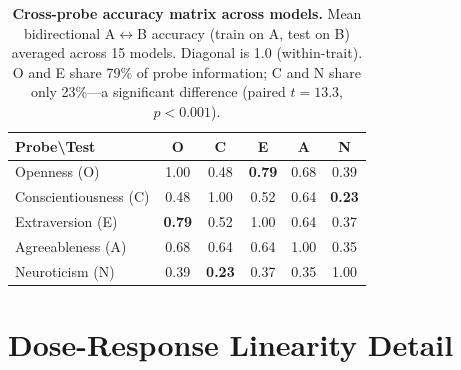 \documentclass{article}
\begin{document}
\begin{table}[h]
\caption{\textbf{Cross-probe accuracy matrix across models.} Mean bidirectional A$\leftrightarrow$B accuracy (train on A, test on B) averaged across 15 models. Diagonal is 1.0 (within-trait). O and E share 79\% of probe information; C and N share only 23\%---a significant difference (paired $t{=}13.3$, $p{<}0.001$).}
\label{tab:cross_probe}
\centering
\small
\begin{tabular}{lccccc}
\toprule
\textbf{Probe\textbackslash Test} & \textbf{O} & \textbf{C} & \textbf{E} & \textbf{A} & \textbf{N} \\
\midrule
Openness (O)         & 1.00 & 0.48 & \textbf{0.79} & 0.68 & 0.39 \\
Conscientiousness (C)& 0.48 & 1.00 & 0.52 & 0.64 & \textbf{0.23} \\
Extraversion (E)     & \textbf{0.79} & 0.52 & 1.00 & 0.64 & 0.37 \\
Agreeableness (A)    & 0.68 & 0.64 & 0.64 & 1.00 & 0.35 \\
Neuroticism (N)      & 0.39 & \textbf{0.23} & 0.37 & 0.35 & 1.00 \\
\bottomrule
\end{tabular}
\end{table}

\section{Dose-Response Linearity Detail}\label{app:linearity_detail}
\end{document}
